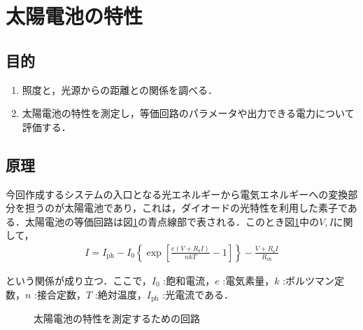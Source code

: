 \documentclass[1_power_supply.tex]{subfiles}
\begin{document}
\section{太陽電池の特性}

\subsection{目的}

\begin{enumerate}
	\item 照度と，光源からの距離との関係を調べる．
	\item 太陽電池の特性を測定し，等価回路のパラメータや出力できる電力について評価する．
\end{enumerate}

\subsection{原理}

今回作成するシステムの入口となる光エネルギーから電気エネルギーへの変換部分を担うのが太陽電池であり，これは，ダイオードの光特性を利用した素子である．太陽電池の等価回路は図\ref{fig:1_2}の青点線部で表される．このとき図\ref{fig:1_2}中の$V,I$に関して，
\begin{align}
	I = I_\mathrm{ph}-I_0\left\{\exp[\frac{e(V+R_\mathrm{s}I)}{nkT}-1]\right\}-\frac{V+R_\mathrm{s}I}{R_\mathrm{sh}}
\end{align}

という関係が成り立つ．ここで，$I_0$ :飽和電流，$e$ :電気素量，$k$ :ボルツマン定数，$n$ :接合定数，$T$ :絶対温度，$I_\mathrm{ph}$ :光電流である．

\begin{figure}[htbp]
	\begin{center}
		\caption{太陽電池の特性を測定するための回路}\label{fig:1_2}
	\end{center}
\end{figure}
\end{document}
